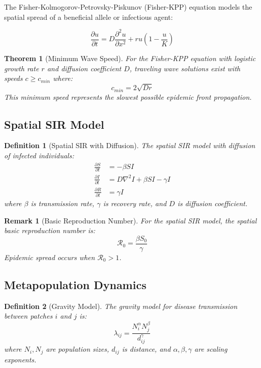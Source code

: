\documentclass[a4paper, 11pt]{article}
\newtheorem{definition}{Definition}[section]
\newtheorem{theorem}{Theorem}[section]
\newtheorem{remark}{Remark}[section]
\begin{document}
The Fisher-Kolmogorov-Petrovsky-Piskunov (Fisher-KPP) equation models the spatial spread of
a beneficial allele or infectious agent:

\begin{equation}
\frac{\partial u}{\partial t} = D\frac{\partial^2 u}{\partial x^2} + ru\left(1 - \frac{u}{K}\right)
\end{equation}

\begin{theorem}[Minimum Wave Speed]
For the Fisher-KPP equation with logistic growth rate $r$ and diffusion coefficient $D$,
traveling wave solutions exist with speeds $c \geq c_{min}$ where:
\begin{equation}
c_{min} = 2\sqrt{Dr}
\end{equation}
This minimum speed represents the slowest possible epidemic front propagation.
\end{theorem}

\subsection{Spatial SIR Model}

\begin{definition}[Spatial SIR with Diffusion]
The spatial SIR model with diffusion of infected individuals:
\begin{align}
\frac{\partial S}{\partial t} &= -\beta SI \\
\frac{\partial I}{\partial t} &= D\nabla^2 I + \beta SI - \gamma I \\
\frac{\partial R}{\partial t} &= \gamma I
\end{align}
where $\beta$ is transmission rate, $\gamma$ is recovery rate, and $D$ is diffusion coefficient.
\end{definition}

\begin{remark}[Basic Reproduction Number]
For the spatial SIR model, the spatial basic reproduction number is:
\begin{equation}
\mathcal{R}_0 = \frac{\beta S_0}{\gamma}
\end{equation}
Epidemic spread occurs when $\mathcal{R}_0 > 1$.
\end{remark}

\subsection{Metapopulation Dynamics}

\begin{definition}[Gravity Model]
The gravity model for disease transmission between patches $i$ and $j$ is:
\begin{equation}
\lambda_{ij} = \frac{N_i^\alpha N_j^\beta}{d_{ij}^\gamma}
\end{equation}
where $N_i, N_j$ are population sizes, $d_{ij}$ is distance, and $\alpha, \beta, \gamma$ are
scaling exponents.
\end{definition}
\end{document}
